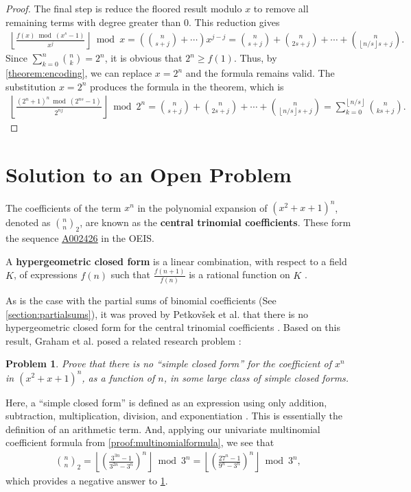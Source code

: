 \documentclass[10pt]{article}
\theoremstyle{plain}
\newtheorem{problem}{Problem}[section]
\newcommand{\floor}[1]{\left\lfloor #1 \right\rfloor}
\newcommand{\seqnum}[1]{\href{https://oeis.org/#1}{\rm \underline{#1}}}
\begin{document}
\begin{proof}
The final step is reduce the floored result modulo $x$ to remove all remaining terms with degree greater than $0$. This reduction gives
\begin{align*}
\floor{\frac{f(x) \bmod(x^s-1)}{x^j}} \bmod x
= \left(\binom{n}{s+j} + \cdots \right) x^{j-j}
= \binom{n}{s+j} + \binom{n}{2s+j} + \cdots + \binom{n}{\floor{n/s}s+j}
.
\end{align*}
Since $\sum_{k=0}^{n} \binom{n}{k} = 2^n$, it is obvious that $2^n \geq f(1)$. Thus, by \cref{theorem:encoding}, we can replace $x=2^n$ and the formula remains valid. The substitution $x=2^n$ produces the formula in the theorem, which is
\begin{align*}
\floor{\frac{(2^n+1)^n \bmod(2^{ns}-1)}{2^{nj}}} \bmod 2^n
= \binom{n}{s+j} + \binom{n}{2s+j} + \cdots + \binom{n}{\floor{n/s}s+j}
= \sum_{k=0}^{\floor{n/s}} \binom{n}{ks+j} .
\end{align*}
\end{proof}

\section{Solution to an Open Problem} \label{section:centraltrinomialcoefficients}
The coefficients of the term $x^n$ in the polynomial expansion of $(x^2+x+1)^n$, denoted as $\binom{n}{n}_2$, are known as the \textbf{central trinomial coefficients}. These form the sequence \seqnum{A002426} in the OEIS. 

A \textbf{hypergeometric closed form} is a linear combination, with respect to a field $K$, of expressions $f(n)$ such that $\frac{f(n+1)}{f(n)}$ is a rational function on $K$ \cite{petkovsek1996ab, sauras2018thesis}.

As is the case with the partial sums of binomial coefficients (See \cref{section:partialsums}), it was proved by Petkovšek et al. that there is no hypergeometric closed form for the central trinomial coefficients \cite{petkovsek1996ab}. Based on this result, Graham et al. posed a related research problem \cite{graham1994concrete}:
\begin{problem} \label{problem:grahametal}
Prove that there is no ``simple closed form'' for the coefficient of $x^n$ in $(x^2+x+1)^n$, as a function of $n$, in some large class of simple closed forms.
\end{problem}
Here, a ``simple closed form'' is defined as an expression using only addition, subtraction, multiplication, division, and exponentiation \cite{graham1994concrete}. This is essentially the definition of an arithmetic term. And, applying our univariate multinomial coefficient formula from \cref{proof:multinomialformula}, we see that
\begin{align*}
    \binom{n}{n}_2 = \floor{\left(\frac{3^{3n} - 1}{3^{2n} - 3^n}\right)^n} \bmod 3^n
    = \floor{\left(\frac{27^n - 1}{9^n - 3^n}\right)^n} \bmod 3^n ,
\end{align*}
which provides a negative answer to \cref{problem:grahametal}.
\end{document}
